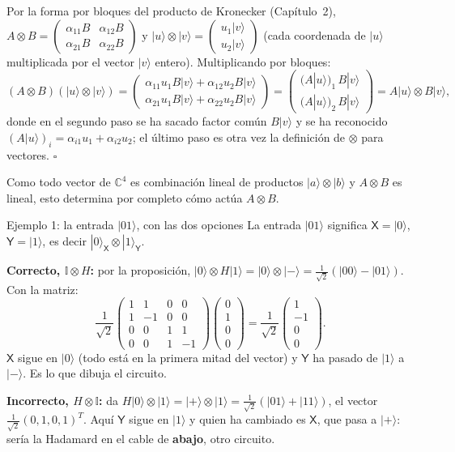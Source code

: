 \documentclass[11pt, a4paper, twoside, openright]{report}
\providecommand{\ket}[1]{|#1\rangle}
\newcommand{\X}{\mathsf{X}}
\newcommand{\Y}{\mathsf{Y}}
\newcommand{\I}{\mathbb{I}}
\newcommand{\rdos}{\tfrac{1}{\sqrt2}}
\begin{document}
\begin{demo}
Por la forma por bloques del producto de Kronecker (Capítulo~2), $A\otimes B=\begin{pmatrix}\alpha_{11}B&\alpha_{12}B\\ \alpha_{21}B&\alpha_{22}B\end{pmatrix}$ y $\ket{u}\otimes\ket{v}=\begin{pmatrix}u_1\ket{v}\\u_2\ket{v}\end{pmatrix}$ (cada coordenada de $\ket u$ multiplicada por el vector $\ket v$ entero). Multiplicando por bloques:
\[
(A\otimes B)(\ket{u}\otimes\ket{v})
=\begin{pmatrix}\alpha_{11}u_1 B\ket{v}+\alpha_{12}u_2 B\ket{v}\\ \alpha_{21}u_1 B\ket{v}+\alpha_{22}u_2 B\ket{v}\end{pmatrix}
=\begin{pmatrix}(A\ket u)_1\, B\ket{v}\\ (A\ket u)_2\, B\ket{v}\end{pmatrix}
=A\ket{u}\otimes B\ket{v},
\]
donde en el segundo paso se ha sacado factor común $B\ket v$ y se ha reconocido $(A\ket u)_i=\alpha_{i1}u_1+\alpha_{i2}u_2$; el último paso es otra vez la definición de $\otimes$ para vectores. \hfill$\square$

\smallskip
Como todo vector de $\mathbb{C}^4$ es combinación lineal de productos $\ket{a}\otimes\ket{b}$ y $A\otimes B$ es lineal, esto determina por completo cómo actúa $A\otimes B$.
\end{demo}

\begin{ejemplo}{Ejemplo 1: la entrada $\ket{01}$, con las dos opciones}
La entrada $\ket{01}$ significa $\X=\ket0$, $\Y=\ket1$, es decir $\ket{0}_\X\otimes\ket{1}_\Y$.

\textbf{Correcto, $\I\otimes H$:} por la proposición, $\ket0\otimes H\ket1 = \ket0\otimes\ket{-} = \rdos(\ket{00}-\ket{01})$. Con la matriz:
\[
\frac{1}{\sqrt2}\begin{pmatrix} 1&1&0&0\\1&-1&0&0\\0&0&1&1\\0&0&1&-1\end{pmatrix}\begin{pmatrix}0\\1\\0\\0\end{pmatrix}
=\frac{1}{\sqrt2}\begin{pmatrix}1\\-1\\0\\0\end{pmatrix}.
\]
$\X$ sigue en $\ket0$ (todo está en la primera mitad del vector) y $\Y$ ha pasado de $\ket1$ a $\ket-$. Es lo que dibuja el circuito.

\textbf{Incorrecto, $H\otimes\I$:} da $H\ket0\otimes\ket1 = \ket+\otimes\ket1=\rdos(\ket{01}+\ket{11})$, el vector $\rdos(0,1,0,1)^T$. Aquí $\Y$ sigue en $\ket1$ y quien ha cambiado es $\X$, que pasa a $\ket+$: sería la Hadamard en el cable de \textbf{abajo}, otro circuito.
\end{ejemplo}
\end{document}
